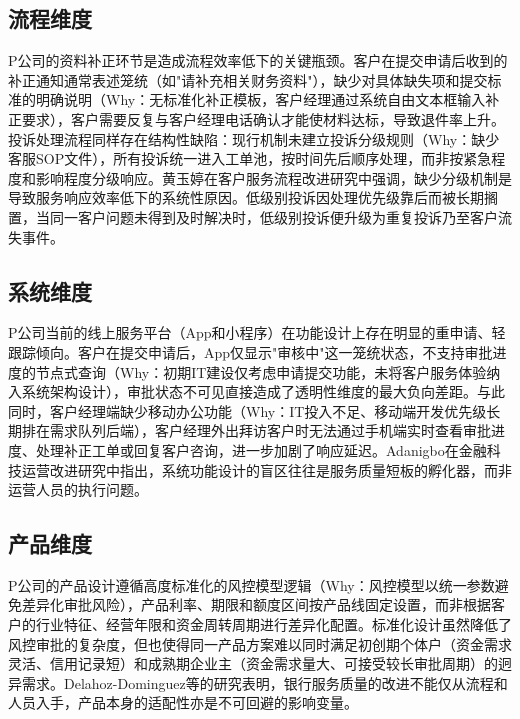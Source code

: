 \subsection{流程维度}

P公司的资料补正环节是造成流程效率低下的关键瓶颈。客户在提交申请后收到的补正通知通常表述笼统（如"请补充相关财务资料"），缺少对具体缺失项和提交标准的明确说明（Why：无标准化补正模板，客户经理通过系统自由文本框输入补正要求），客户需要反复与客户经理电话确认才能使材料达标，导致退件率上升。投诉处理流程同样存在结构性缺陷：现行机制未建立投诉分级规则（Why：缺少客服SOP文件），所有投诉统一进入工单池，按时间先后顺序处理，而非按紧急程度和影响程度分级响应。黄玉婷在客户服务流程改进研究中强调，缺少分级机制是导致服务响应效率低下的系统性原因\cite{ref53}。低级别投诉因处理优先级靠后而被长期搁置，当同一客户问题未得到及时解决时，低级别投诉便升级为重复投诉乃至客户流失事件。\par

\subsection{系统维度}

P公司当前的线上服务平台（App和小程序）在功能设计上存在明显的重申请、轻跟踪倾向。客户在提交申请后，App仅显示"审核中"这一笼统状态，不支持审批进度的节点式查询（Why：初期IT建设仅考虑申请提交功能，未将客户服务体验纳入系统架构设计），审批状态不可见直接造成了透明性维度的最大负向差距。与此同时，客户经理端缺少移动办公功能（Why：IT投入不足、移动端开发优先级长期排在需求队列后端），客户经理外出拜访客户时无法通过手机端实时查看审批进度、处理补正工单或回复客户咨询，进一步加剧了响应延迟。Adanigbo在金融科技运营改进研究中指出，系统功能设计的盲区往往是服务质量短板的孵化器，而非运营人员的执行问题\cite{ref49}。\par

\subsection{产品维度}

P公司的产品设计遵循高度标准化的风控模型逻辑（Why：风控模型以统一参数避免差异化审批风险），产品利率、期限和额度区间按产品线固定设置，而非根据客户的行业特征、经营年限和资金周转周期进行差异化配置。标准化设计虽然降低了风控审批的复杂度，但也使得同一产品方案难以同时满足初创期个体户（资金需求灵活、信用记录短）和成熟期企业主（资金需求量大、可接受较长审批周期）的迥异需求。Delahoz-Dominguez等的研究表明，银行服务质量的改进不能仅从流程和人员入手，产品本身的适配性亦是不可回避的影响变量\cite{ref50}。\par

